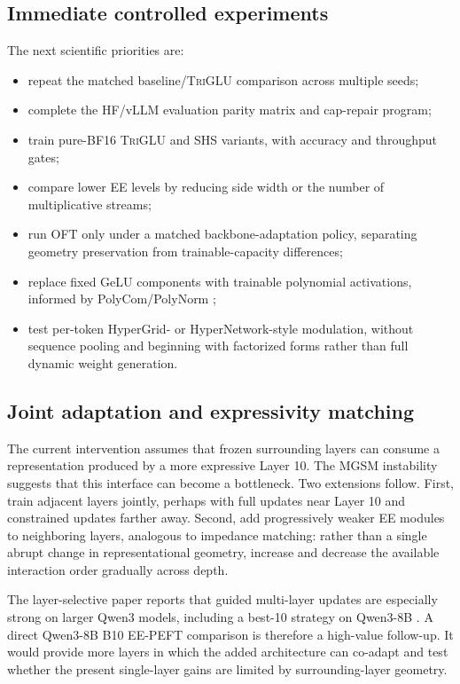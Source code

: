 \documentclass[10pt]{article}
\newcommand{\TriGLU}{\textsc{TriGLU}}
\begin{document}
\subsection{Immediate controlled experiments}

The next scientific priorities are:
\begin{itemize}
  \item repeat the matched baseline/\TriGLU{} comparison across multiple seeds;
  \item complete the HF/vLLM evaluation parity matrix and cap-repair program;
  \item train pure-BF16 \TriGLU{} and SHS variants, with accuracy and throughput
        gates;
  \item compare lower EE levels by reducing side width or the number of
        multiplicative streams;
  \item run OFT only under a matched backbone-adaptation policy, separating
        geometry preservation from trainable-capacity differences;
  \item replace fixed GeLU components with trainable polynomial activations,
        informed by PolyCom/PolyNorm \citep{zhuo2024polycom};
  \item test per-token HyperGrid- or HyperNetwork-style modulation, without
        sequence pooling and beginning with factorized forms rather than full
        dynamic weight generation.
\end{itemize}

\subsection{Joint adaptation and expressivity matching}

The current intervention assumes that frozen surrounding layers can consume a
representation produced by a more expressive Layer 10.  The MGSM instability
suggests that this interface can become a bottleneck.  Two extensions follow.
First, train adjacent layers jointly, perhaps with full updates near Layer 10
and constrained updates farther away.  Second, add progressively weaker EE
modules to neighboring layers, analogous to impedance matching: rather than a
single abrupt change in representational geometry, increase and decrease the
available interaction order gradually across depth.

The layer-selective paper reports that guided multi-layer updates are especially
strong on larger Qwen3 models, including a best-10 strategy on Qwen3-8B
\citep{zhang2026onelayer}.  A direct Qwen3-8B B10 EE-PEFT comparison is therefore
a high-value follow-up.  It would provide more layers in which the added
architecture can co-adapt and test whether the present single-layer gains are
limited by surrounding-layer geometry.
\end{document}

